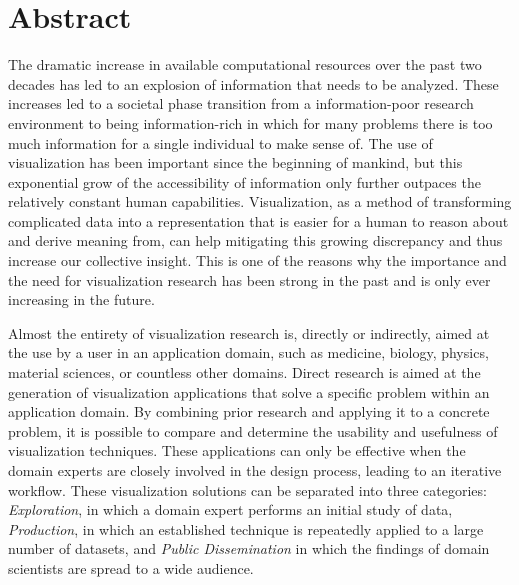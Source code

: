 \chapter*{Abstract}

The dramatic increase in available computational resources over the past two decades has led to an explosion of information that needs to be analyzed.  These increases led to a societal phase transition from a information-poor research environment to being information-rich in which for many problems there is too much information for a single individual to make sense of.  The use of visualization has been important since the beginning of mankind, but this exponential grow of the accessibility of information only further outpaces the relatively constant human capabilities.  Visualization, as a method of transforming complicated data into a representation that is easier for a human to reason about and derive meaning from, can help mitigating this growing discrepancy and thus increase our collective insight.  This is one of the reasons why the importance and the need for visualization research has been  strong in the past and is only ever increasing in the future.

Almost the entirety of visualization research is, directly or indirectly, aimed at the use by a user in an application domain, such as medicine, biology, physics, material sciences, or countless other domains.  Direct research is aimed at the generation of visualization applications that solve a specific problem within an application domain.  By combining prior research and applying it to a concrete problem, it is possible to compare and determine the usability and usefulness of visualization techniques.  These applications can only be effective when the domain experts are closely involved in the design process, leading to an iterative workflow.  These visualization solutions can be separated into three categories:  \emph{Exploration}, in which a domain expert performs an initial study of data, \emph{Production}, in which an established technique is repeatedly applied to a large number of datasets, and \emph{Public Dissemination} in which the findings of domain scientists are spread to a wide audience.

